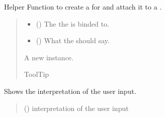 \documentclass[letterpaper,10pt,english]{sphinxmanual}
\begin{document}
\begin{fulllineitems}
\begin{fulllineitems}
\end{fulllineitems}


\begin{fulllineitems}
\label{\detokenize{CTkInterface:src.CTkInterface.MainApp.create_tooltip_for}}
\pysigstartsignatures
{}
\pysigstopsignatures
\sphinxAtStartPar
Helper Function to create a  for and attach it to a .
\begin{quote}\begin{description}
\begin{itemize}
\item {} 
\sphinxAtStartPar
{} () \textendash{} The  the  is binded to.

\item {} 
\sphinxAtStartPar
{} () \textendash{} What the  should say.

\end{itemize}

\sphinxAtStartPar
A new  instance.

\sphinxAtStartPar
ToolTip

\end{description}\end{quote}

\end{fulllineitems}


\begin{fulllineitems}
\label{\detokenize{CTkInterface:src.CTkInterface.MainApp.display_interpreted_input}}
\pysigstartsignatures
{}
\pysigstopsignatures
\sphinxAtStartPar
Shows the interpretation of the user input.
\begin{quote}\begin{description}
\sphinxAtStartPar
{} () \textendash{} interpretation of the user input


\end{description}
\end{quote}
\end{fulllineitems}
\end{fulllineitems}
\end{document}
